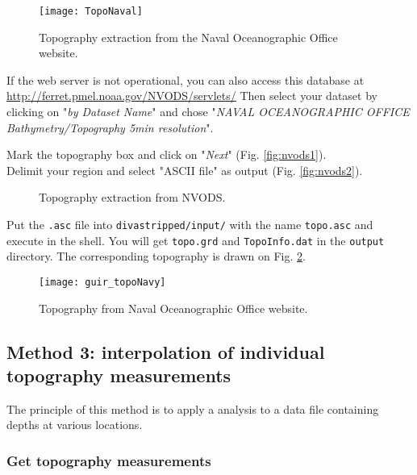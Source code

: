 \begin{figure}[htpb]
\centering
\texttt{[image: TopoNaval]}
\caption{Topography extraction from the Naval Oceanographic Office website.\label{fig:topoextract}}
\end{figure}

If the web server is not operational, you can also access this database at \url{http://ferret.pmel.noaa.gov/NVODS/servlets/}
Then select your dataset by clicking on "\textsl{by Dataset Name}" and chose 
"\textsl{NAVAL OCEANOGRAPHIC OFFICE Bathymetry/Topography 5min resolution}".

Mark the topography box and click on "\textsl{Next}" (Fig. \ref{fig:nvods1}).\\
Delimit your region and select "ASCII file" as output (Fig. \ref{fig:nvods2}). 


\begin{figure}[htpb]
\centering
{}

\caption{Topography extraction from NVODS.}
\end{figure}


Put the \texttt{.asc} file into \texttt{divastripped/input/} with the name \texttt{topo.asc} and execute  in the shell. You will get \texttt{topo.grd} and \texttt{TopoInfo.dat} in the \texttt{output} directory. The corresponding topography is drawn on Fig. \ref{fig:topoNaval}.


\begin{figure}[htpb]
\centering
\texttt{[image: guir\_topoNavy]}
\caption{Topography from Naval Oceanographic Office website.\label{fig:topoNaval}}
\end{figure}


\subsection{Method 3: interpolation of individual topography measurements\label{sec:topotopex}}

The principle of this method is to apply a \diva analysis to a data file containing depths at various locations.

\subsubsection{Get topography measurements}


